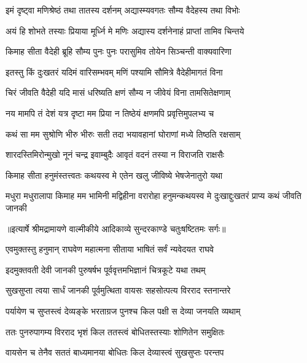 \twolineshloka
{इमं दृष्ट्वा मणिश्रेष्ठं तथा तातस्य दर्शनम्}
{अद्यास्म्यवगतः सौम्य वैदेहस्य तथा विभोः} %

\twolineshloka
{अयं हि शोभते तस्याः प्रियाया मूर्ध्नि मे मणिः}
{अद्यास्य दर्शनेनाहं प्राप्तां तामिव चिन्तये} %

\twolineshloka
{किमाह सीता वैदेही ब्रूहि सौम्य पुनः पुनः}
{परासुमिव तोयेन सिञ्चन्ती वाक्यवारिणा} %

\twolineshloka
{इतस्तु किं दुःखतरं यदिमं वारिसम्भवम्}
{मणिं पश्यामि सौमित्रे वैदेहीमागतं विना} %

\twolineshloka
{चिरं जीवति वैदेही यदि मासं धरिष्यति}
{क्षणं सौम्य न जीवेयं विना तामसितेक्षणाम्} %

\twolineshloka
{नय मामपि तं देशं यत्र दृष्टा मम प्रिया}
{न तिष्ठेयं क्षणमपि प्रवृत्तिमुपलभ्य च} %

\twolineshloka
{कथं सा मम सुश्रोणि भीरु भीरुः सती तदा}
{भयावहानां घोराणां मध्ये तिष्ठति रक्षसाम्} %

\twolineshloka
{शारदस्तिमिरोन्मुखो नूनं चन्द्र इवाम्बुदैः}
{आवृतं वदनं तस्या न विराजति राक्षसैः} %

\twolineshloka
{किमाह सीता हनुमंस्तत्त्वतः कथयस्व मे}
{एतेन खलु जीविष्ये भेषजेनातुरो यथा} %

\threelineshloka
{मधुरा मधुरालापा किमाह मम भामिनी}
{मद्विहीना वरारोहा हनुमन्कथयस्व मे}
{दुःखाद्दुःखतरं प्राप्य कथं जीवति जानकी} %


{॥इत्यार्षे श्रीमद्रामायणे वाल्मीकीये आदिकाव्ये सुन्दरकाण्डे चतुःषष्टितमः सर्गः॥}


\twolineshloka
{एवमुक्तस्तु हनुमान् राघवेण महात्मना}
{सीताया भाषितं सर्वं न्यवेदयत राघवे} %

\twolineshloka
{इदमुक्तवती देवी जानकी पुरुषर्षभ}
{पूर्ववृत्तमभिज्ञानं चित्रकूटे यथा तथम्} %

\twolineshloka
{सुखसुप्ता त्वया सार्धं जानकी पूर्वमुत्थिता}
{वायसः सहसोत्पत्य विरराद स्तनान्तरे} %

\twolineshloka
{पर्यायेण च सुप्तस्त्वं देव्यङ्के भरताग्रज}
{पुनश्च किल पक्षी स देव्या जनयति व्यथाम्} %

\twolineshloka
{ततः पुनरुपागम्य विरराद भृशं किल}
{ततस्त्वं बोधितस्तस्याः शोणितेन समुक्षितः} %

\twolineshloka
{वायसेन च तेनैव सततं बाध्यमानया}
{बोधितः किल देव्यास्त्वं सुखसुप्तः परन्तप} %

